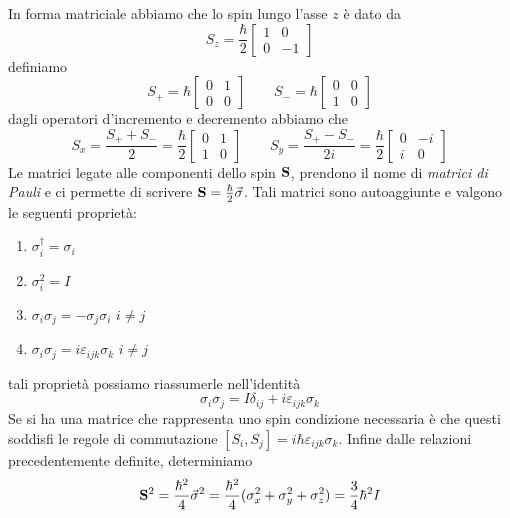 In forma matriciale abbiamo che lo spin lungo l'asse $z$ \`e dato da 
\begin{equation*}
	S_z = \frac{\hbar}{2} \left [ \begin{array}{cc}
		1 & 0 \\
		0 & -1
	\end{array} \right] 
\end{equation*}
definiamo 
\begin{equation*}
	S_+ = \hbar \left [ \begin{array}{cc}
		0 & 1 \\ 
		0 & 0 
	\end{array} \right ] \quad \quad S_- = \hbar  \left [ \begin{array}{cc}
		0 & 0 \\
		1 & 0 
	\end{array} \right ] 
\end{equation*}
dagli  operatori d'incremento e decremento abbiamo che 
\begin{equation*}
	S_x = \frac{S_+ + S_-}{2} = \frac{\hbar }{2} \left [ \begin{array}{cc}
		0 & 1 \\
		1 & 0 
	\end{array} \right ]  \quad \quad S_y = \frac{S_+ - S_-}{2i} = \frac{\hbar }{2} \left [ \begin{array}{cc}
		0 & -i \\
		i & 0
	\end{array}\right ] 
\end{equation*} 
Le matrici legate alle componenti dello spin $\bold{S}$, prendono il nome di \textit{matrici di Pauli} e ci permette di scrivere $\bold{S} = \frac{\hbar}{2} \vec{\sigma}$. Tali matrici sono autoaggiunte e valgono le seguenti propriet\`a:
\begin{enumerate}
	\item $\sigma_i^\dag = \sigma_i$
	\item $\sigma_i^2 =I $
	\item $\sigma_i\sigma_j = - \sigma_j \sigma_i$ \quad {} $i \neq j$ 
	\item $\sigma_i\sigma_j = i \varepsilon_{ijk}\sigma_k$ \quad $i \neq j$
\end{enumerate} 
tali propriet\`a possiamo riassumerle nell'identit\`a 
\begin{equation}
	\sigma_i \sigma_j = I \delta_{ij} + i \varepsilon_{ijk}\sigma_k
\end{equation} 
Se si ha una matrice che rappresenta uno spin condizione necessaria \`e che questi soddisfi le regole di commutazione $[S_i,S_j] = i \hbar \varepsilon_{ijk} \sigma_{k}$. Infine dalle relazioni precedentemente definite, determiniamo
\begin{equation*}
	\bold{S}^2 = \frac{\hbar^2}{4}\vec{\sigma}^2 = \frac{\hbar^2}{4}(\sigma_{x}^2 + \sigma_{y}^2+\sigma_{z}^2) = \frac{3}{4}\hbar^2 I
\end{equation*}

